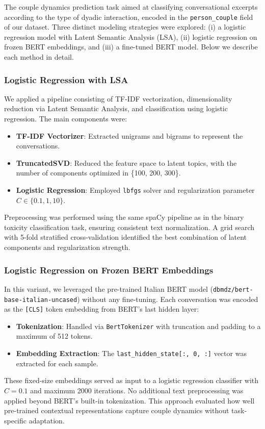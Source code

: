 \documentclass[conference]{IEEEtran}
\begin{document}
The couple dynamics prediction task aimed at classifying conversational excerpts according to the type of dyadic interaction, encoded in the \texttt{person\_couple} field of our dataset. Three distinct modeling strategies were explored: (i) a logistic regression model with Latent Semantic Analysis (LSA), (ii) logistic regression on frozen BERT embeddings, and (iii) a fine-tuned BERT model. Below we describe each method in detail.

\subsubsection{Logistic Regression with LSA}

We applied a pipeline consisting of TF-IDF vectorization, dimensionality reduction via Latent Semantic Analysis, and classification using logistic regression. The main components were:
\begin{itemize}
    \item \textbf{TF-IDF Vectorizer}: Extracted unigrams and bigrams to represent the conversations.
    \item \textbf{TruncatedSVD}: Reduced the feature space to latent topics, with the number of components optimized in \{100, 200, 300\}.
    \item \textbf{Logistic Regression}: Employed \texttt{lbfgs} solver and regularization parameter \(C \in \{0.1, 1, 10\}\).
\end{itemize}
Preprocessing was performed using the same spaCy pipeline as in the binary toxicity classification task, ensuring consistent text normalization. A grid search with 5-fold stratified cross-validation identified the best combination of latent components and regularization strength.

\subsubsection{Logistic Regression on Frozen BERT Embeddings}

In this variant, we leveraged the pre-trained Italian BERT model (\texttt{dbmdz/bert-base-italian-uncased}) without any fine-tuning. Each conversation was encoded as the \texttt{[CLS]} token embedding from BERT's last hidden layer:
\begin{itemize}
    \item \textbf{Tokenization}: Handled via \texttt{BertTokenizer} with truncation and padding to a maximum of 512 tokens.
    \item \textbf{Embedding Extraction}: The \texttt{last\_hidden\_state[:, 0, :]} vector was extracted for each sample.
\end{itemize}
These fixed-size embeddings served as input to a logistic regression classifier with \(C=0.1\) and maximum 2000 iterations. No additional text preprocessing was applied beyond BERT's built-in tokenization. This approach evaluated how well pre-trained contextual representations capture couple dynamics without task-specific adaptation.
\end{document}
